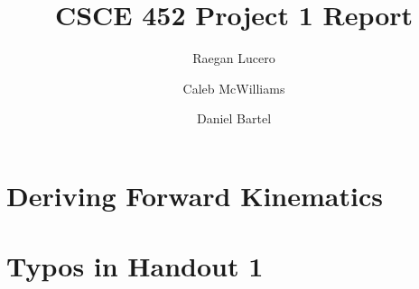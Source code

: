 \documentclass{article}
\title{CSCE 452 Project 1 Report}
\author{Raegan Lucero
\and
 Caleb McWilliams
\and
 Daniel Bartel}
\date{}
\begin{document}
\maketitle

\section*{Deriving Forward Kinematics}

\section*{Typos in Handout 1}
\end{document}

